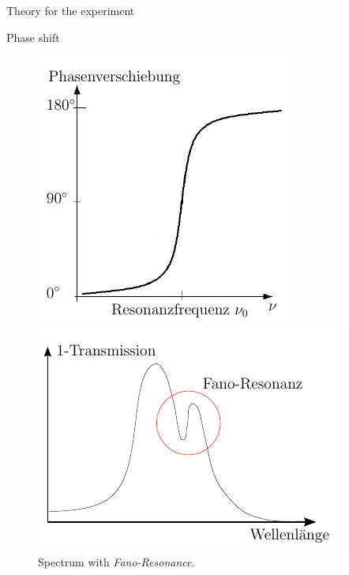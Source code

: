 \documentclass[pdftex, a4paper,11pt, twoside, UKenglish]{report}
\begin{document}
\begin{chapter}{Theory for the experiment}
\begin{section}{Phase shift}
      \begin{figure}[ht!]
        \centering
        \begin{minipage}{.48\textwidth}
          \centering
          \includegraphics[width=.7\textwidth]{Figures/Phaseshift.png}
          \caption{Phase shift around the resonant frequency.}
          \label{fig:Phaseshift}
        \end{minipage}\quad
        \begin{minipage}{.48\textwidth}
          \centering
          \includegraphics[width=\textwidth]{Figures/Fano.png}
          \caption{Spectrum with \textit{Fano-Resonance}.}
          \label{fig:Fano}
        \end{minipage}
      \end{figure}
      

\end{section}
\end{chapter}
\end{document}
